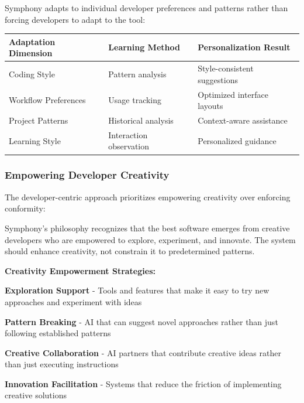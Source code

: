 Symphony adapts to individual developer preferences and patterns rather than forcing developers to adapt to the tool:

\begin{center}
\begin{tabular}{@{}lll@{}}
\toprule
\textbf{Adaptation Dimension} & \textbf{Learning Method} & \textbf{Personalization Result} \\
\midrule
Coding Style & Pattern analysis & Style-consistent suggestions \\
Workflow Preferences & Usage tracking & Optimized interface layouts \\
Project Patterns & Historical analysis & Context-aware assistance \\
Learning Style & Interaction observation & Personalized guidance \\
\bottomrule
\end{tabular}
\label{tab:adaptive-ux}
\end{center}

\subsubsection{Empowering Developer Creativity}

The developer-centric approach prioritizes empowering creativity over enforcing conformity:

\begin{alertbox}
Symphony's philosophy recognizes that the best software emerges from creative developers who are empowered to explore, experiment, and innovate. The system should enhance creativity, not constrain it to predetermined patterns.
\end{alertbox}

\textbf{Creativity Empowerment Strategies:}

\begin{expandedlist}
    \item \textbf{Exploration Support} - Tools and features that make it easy to try new approaches and experiment with ideas
    
    \item \textbf{Pattern Breaking} - AI that can suggest novel approaches rather than just following established patterns
    
    \item \textbf{Creative Collaboration} - AI partners that contribute creative ideas rather than just executing instructions
    
    \item \textbf{Innovation Facilitation} - Systems that reduce the friction of implementing creative solutions
\end{expandedlist}

